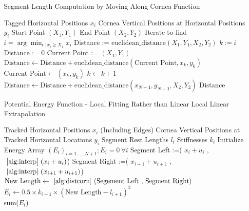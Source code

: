 \documentclass[epjST]{svjour}
\begin{document}
\begin{algorithm}
    \caption{Segment Length Computation by Moving Along Cornea Function}
    \label{alg:distcorn}
    \begin{algorithmic}[1]
        \Require Tagged Horizontal Positions $x_i$
        \Require Cornea Vertical Positions at Horizontal Positions $y_i$
        \Require Start Point $(X_1, Y_1)$
        \Require End Point $(X_2, Y_2)$
       \State Iterate to find $ i=\arg\!\min_{i\:|\:x_i\geq X_1} x_i$
       \State Distance := $\text{euclidean\_distance}(X_1, Y_1,X_2, Y_2)$
       \Else\State
       $k:=i$
       Distance := 0
       Current Point := $(X_1, Y_1)$
        \State $\text{Distance} \gets \text{Distance} + \text{euclidean\_distance}(\text{Current Point}, x_k,y_k)$
        \State
        $\text{Current Point}\gets (x_k,y_k)$
        \State
       $k\gets k+1$
       \EndWhile
       \EndIf
       \State $\text{Distance}\gets \text{Distance} + \text{euclidean\_distance}(x_{N+1},y_{N+1}, X_2, Y_2)$
       \EndIf
       \State \Return Distance
    \end{algorithmic}
\end{algorithm}
\begin{algorithm}
    \caption{Potential Energy Function - Local Fitting Rather than Linear Local Linear Extrapolation}
    \label{potinterp}
   \begin{algorithmic}[1]
        \Require Tracked Horizontal Positions $x_i$ (Including Edges)
        \Require Cornea Vertical Positions at Tracked Horizontal Locations $y_i$
        \Require Segment Rest Lengths $l_i$
        \Require Stiffnesses $k_i$
        \State Initialize Energy Array $(E_i)_{i=1,...,N+1}; E_i = 0\:\forall i$
        \State Segment Left :=( $x_i+u_i$ , $\text{ \autoref{alg:interp} }(x_i+u_i)$)
        \State Segment Right :=( $x_{i+1}+u_{i+1}$ , $\text{ \autoref{alg:interp} }(x_{i+1}+u_{i+1})$)
        \State $\text{New Length}\gets \text{ \autoref{alg:distcorn} }(\text{Segement Left , Segment Right})$
        \State $E_i\gets 0.5\times k_{i+1} \times (\text{New Length} - l_{i+1})^2$
        \EndFor\\
        \Return sum($E_i$)
    \end{algorithmic}
\end{algorithm}
\end{document}
